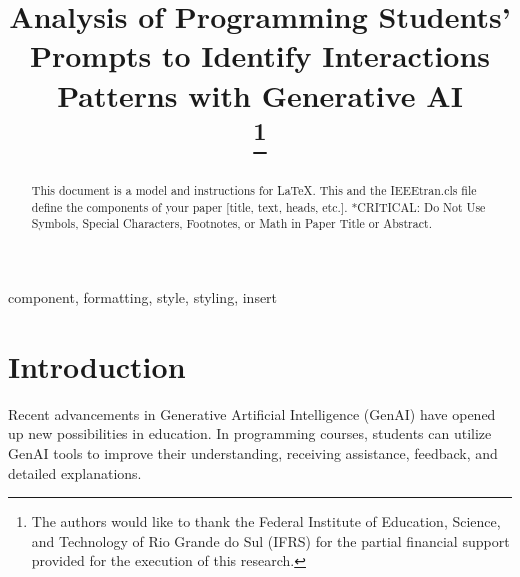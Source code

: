 \documentclass[conference]{IEEEtran}
\begin{document}
\title{Analysis of Programming Students' Prompts to Identify Interactions
Patterns with Generative AI \\
{\footnotesize \textsuperscript{}}
\thanks{The authors would like to thank the Federal Institute of Education,
Science, and Technology of Rio Grande do Sul (IFRS) for the partial financial
support provided for the execution of this research.}
}

\author{
\and
{}
\and
{}
}

\maketitle

\begin{abstract}
This document is a model and instructions for \LaTeX.
This and the IEEEtran.cls file define the components of your paper [title, text, heads, etc.]. *CRITICAL: Do Not Use Symbols, Special Characters, Footnotes, 
or Math in Paper Title or Abstract.
\end{abstract}

\begin{IEEEkeywords}
component, formatting, style, styling, insert
\end{IEEEkeywords}

\section{Introduction}


Recent advancements in Generative Artificial Intelligence (GenAI) have opened
up new possibilities in education. In programming courses, students can utilize
GenAI tools to improve their understanding, receiving assistance, feedback, and
detailed explanations.
\end{document}
